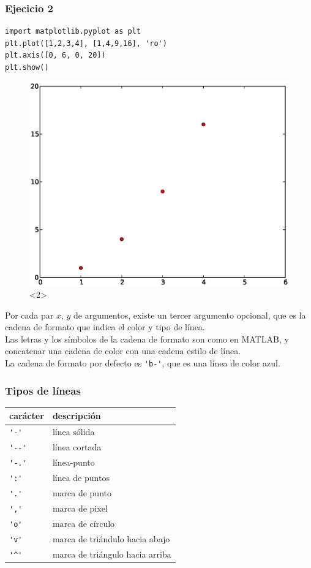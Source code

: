 \begin{frame}[fragile]
\frametitle{Ejecicio 2}
\begin{lstlisting}
import matplotlib.pyplot as plt
plt.plot([1,2,3,4], [1,4,9,16], 'ro')
plt.axis([0, 6, 0, 20])
plt.show()
\end{lstlisting}
\begin{figure}
	\centering
	\includegraphics[scale=0.35]{plotEjercicio2.eps}<2> 
\end{figure}
\end{frame}
\begin{frame}[fragile]
Por cada par $x$, $y$ de argumentos, existe un tercer argumento opcional, que es la cadena de formato que indica el color y tipo de línea.
\\
\medskip
Las letras y los símbolos de la cadena de formato son como en MATLAB, y concatenar una cadena de color con una cadena estilo de línea.
\\
\medskip
La cadena de formato por defecto es \verb|'b-'|, que es una línea de color azul.
\end{frame}
\begin{frame}[fragile]
\frametitle{Tipos de líneas}
\begin{tabular}{l | l}
carácter & descripción \\ \hline
\verb|'-'|	& línea sólida \\ \hline
\verb|'--'| & línea cortada \\ \hline
\verb|'-.'| & línea-punto \\ \hline
\verb|':'|	& línea de puntos \\ \hline
\verb|'.'|	& marca de punto \\ \hline
\verb|','|	& marca de pixel \\ \hline
\verb|'o'|	& marca de círculo \\ \hline
\verb|'v'|	& marca de triándulo hacia abajo \\ \hline
\verb|'^'|	& marca de triángulo hacia arriba
\end{tabular}
\end{frame}
